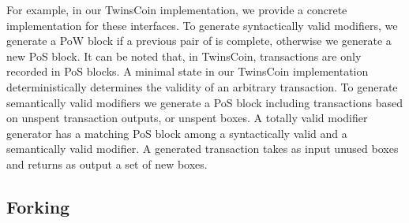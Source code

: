For example, in our TwinsCoin implementation, we provide a concrete implementation for these interfaces. To generate syntactically valid modifiers, we generate a PoW block if a previous pair of {\em<PoW block, PoS block>} is complete, otherwise we generate a new PoS block. It can be noted that, in TwinsCoin, transactions are only recorded in PoS blocks. A minimal state in our TwinsCoin implementation deterministically determines the validity of an arbitrary transaction. To generate semantically valid modifiers we generate a PoS block including transactions based on unspent transaction outputs, or unspent boxes. A totally valid modifier generator has a matching PoS block among a syntactically valid and a semantically valid modifier. A generated transaction takes as input unused boxes and returns as output a set of new boxes.

\subsection{Forking}


